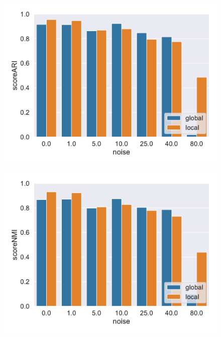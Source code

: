 \begin{figure}[h]
    \centering
    \begin{minipage}[t]{.5\textwidth}
      \centering  
      \captionsetup{width=.9\linewidth}
      \includegraphics[width=\textwidth]{evaluation/per_noise/Best_ARI_3D_O10000_pnoise_bar.pdf}
      \label{fig:ariperpts}
    \end{minipage}%
    \begin{minipage}[t]{.5\textwidth}
      \centering
      \captionsetup{width=.9\linewidth}
      \includegraphics[width=\textwidth]{evaluation/per_noise/Best_NMI_3D_O10000_pnoise_bar.pdf}
      \label{fig:nmiperpts}
    \end{minipage}
\end{figure}
